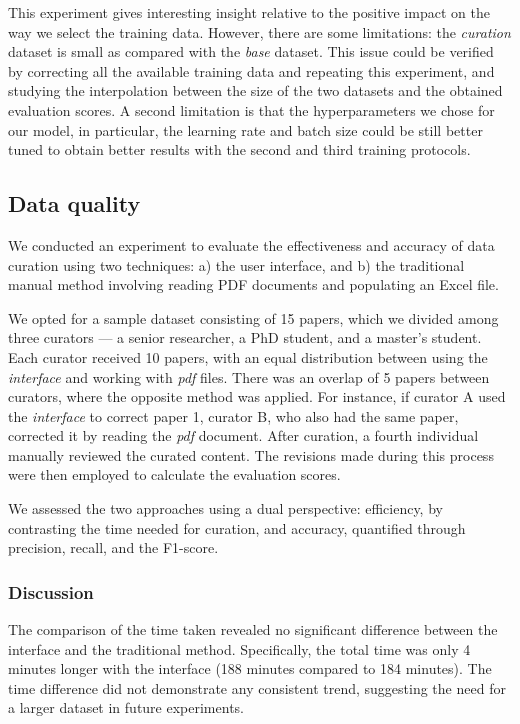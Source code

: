 \documentclass[a4paper]{article}
\begin{document}
This experiment gives interesting insight relative to the positive impact on the way we select the training data. 
However, there are some limitations: the \emph{curation} dataset is small as compared with the \emph{base} dataset. This issue could be verified by correcting all the available training data and repeating this experiment, and studying the interpolation between the size of the two datasets and the obtained evaluation scores. 
A second limitation is that the hyperparameters we chose for our model, in particular, the learning rate and batch size could be still better tuned to obtain better results with the second and third training protocols.


\subsection{Data quality}
\label{sec:interface-evaluation}
We conducted an experiment to evaluate the effectiveness and accuracy of data curation using two techniques: a) the user interface, and b) the traditional manual method involving reading PDF documents and populating an Excel file.

We opted for a sample dataset consisting of 15 papers, which we divided among three curators — a senior researcher, a PhD student, and a master's student. Each curator received 10 papers, with an equal distribution between using the \textit{interface} and working with \textit{pdf} files. 
There was an overlap of 5 papers between curators, where the opposite method was applied. 
For instance, if curator A used the \textit{interface} to correct paper 1, curator B, who also had the same paper, corrected it by reading the \textit{pdf} document.
After curation, a fourth individual manually reviewed the curated content. The revisions made during this process were then employed to calculate the evaluation scores.

We assessed the two approaches using a dual perspective: efficiency, by contrasting the time needed for curation, and accuracy, quantified through precision, recall, and the F1-score.

\subsubsection{Discussion}
The comparison of the time taken revealed no significant difference between the interface and the traditional method. Specifically, the total time was only 4 minutes longer with the interface (188 minutes compared to 184 minutes). The time difference did not demonstrate any consistent trend, suggesting the need for a larger dataset in future experiments.
\end{document}
